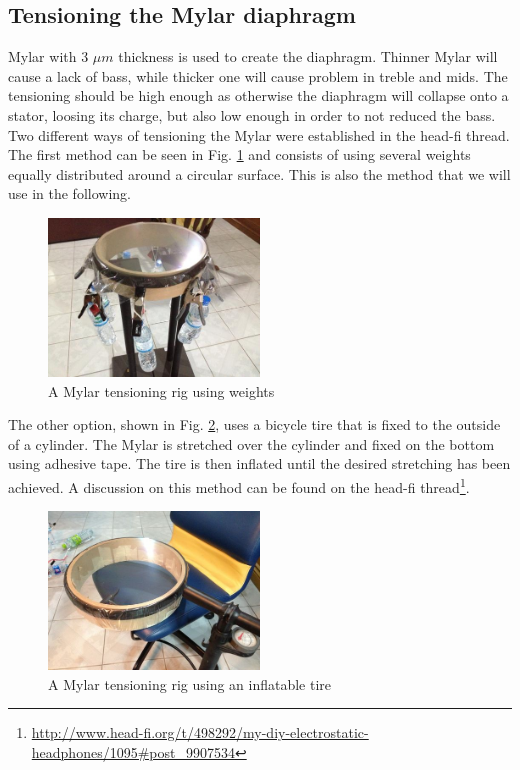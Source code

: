 \documentclass{article}
\begin{document}
\subsection{Tensioning the Mylar diaphragm}
\label{s:driver:tension}
Mylar with 3 $\mu m$ thickness is used to create the diaphragm. Thinner Mylar will cause a lack of bass, while thicker one will cause problem in treble and mids. The tensioning should be high enough as otherwise the diaphragm will collapse onto a stator, loosing its charge, but also low enough in order to not reduced the bass. Two different ways of tensioning the Mylar were established in the head-fi thread.
The first method can be seen in Fig. \ref{f:driver:tension:weight} and consists of using several weights equally distributed around a circular surface. This is also the method that we will use in the following.
\begin{figure}[htb]
    \centering
    \includegraphics[width=0.5\textwidth]{images/mylar-tension-weight.png}
    \caption{A Mylar tensioning rig using weights}
    \label{f:driver:tension:weight}
\end{figure}
The other option, shown in Fig. \ref{f:driver:tension:tire}, uses a bicycle tire that is fixed to the outside of a cylinder. The Mylar is stretched over the cylinder and fixed on the bottom using adhesive tape. The tire is then inflated until the desired stretching has been achieved. A discussion on this method can be found on the head-fi thread\footnote{\url{http://www.head-fi.org/t/498292/my-diy-electrostatic-headphones/1095#post_9907534}}.
\begin{figure}[htb]
    \centering
    \includegraphics[width=0.5\textwidth]{images/mylar-tension-tire.png}
    \caption{A Mylar tensioning rig using an inflatable tire}
    \label{f:driver:tension:tire}
\end{figure}
\end{document}
